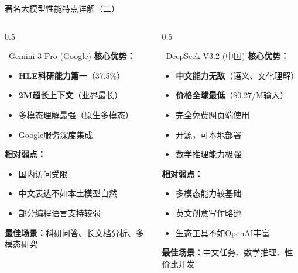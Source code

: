 \documentclass[aspectratio=169,11pt]{beamer}
\begin{document}
\begin{frame}{著名大模型性能特点详解（二）}
    \begin{columns}
        \begin{column}{0.5\textwidth}
            \begin{block}{\textcolor{googleblue}{\faGoogle\ Gemini 3 Pro (Google)}}
                \textbf{核心优势：}
                \begin{itemize}
                    \item \textbf{HLE科研能力第一}（37.5\%）
                    \item \textbf{2M超长上下文}（业界最长）
                    \item 多模态理解最强（原生多模态）
                    \item Google服务深度集成
                \end{itemize}
                \textbf{相对弱点：}
                \begin{itemize}
                    \item 国内访问受限
                    \item 中文表达不如本土模型自然
                    \item 部分编程语言支持较弱
                \end{itemize}
                \textbf{最佳场景：}科研问答、长文档分析、多模态研究
            \end{block}
        \end{column}
        \begin{column}{0.5\textwidth}
            \begin{block}{\textcolor{deepseekblue}{\faBrain\ DeepSeek V3.2 (中国)}}
                \textbf{核心优势：}
                \begin{itemize}
                    \item \textbf{中文能力无敌}（语义、文化理解）
                    \item \textbf{价格全球最低}（\$0.27/M输入）
                    \item 完全免费网页端使用
                    \item 开源，可本地部署
                    \item 数学推理能力极强
                \end{itemize}
                \textbf{相对弱点：}
                \begin{itemize}
                    \item 多模态能力较基础
                    \item 英文创意写作略逊
                    \item 生态工具不如OpenAI丰富
                \end{itemize}
                \textbf{最佳场景：}中文任务、数学推理、性价比开发
            \end{block}
        \end{column}
    \end{columns}
\end{frame}
\end{document}
